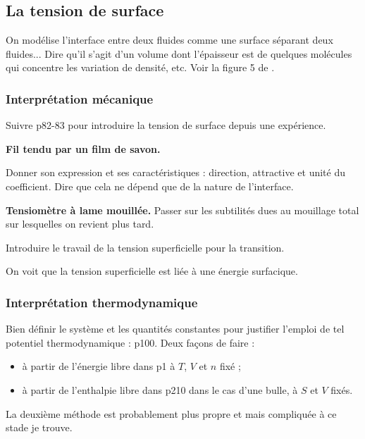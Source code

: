 \subsection{La tension de surface}

On modélise l'interface entre deux fluides comme une surface séparant deux fluides...
Dire qu'il s'agit d'un volume dont l'épaisseur est de quelques molécules qui concentre les variation de densité, etc.
Voir la figure 5 de \cite{Marchand2011}.

\subsubsection{Interprétation mécanique}

Suivre \cite{Diu2008} p82-83 pour introduire la tension de surface depuis une expérience.

\begin{experience}
\textbf{Fil tendu par un film de savon.}
\end{experience}

Donner son expression et ses caractéristiques : direction, attractive et unité du coefficient.
Dire que cela ne dépend que de la nature de l'interface.

\begin{experience}
\textbf{Tensiomètre à lame mouillée.}
Passer sur les subtilités dues au mouillage total sur lesquelles on revient plus tard.
\end{experience}

Introduire le travail de la tension superficielle pour la transition.

\begin{transition}
On voit que la tension superficielle est liée à une énergie surfacique.
\end{transition}

\subsubsection{Interprétation thermodynamique}

Bien définir le système et les quantités constantes pour justifier l'emploi de tel potentiel thermodynamique : \cite{Graner2011} p100.
Deux façons de faire :
\begin{itemize}
\item à partir de l'énergie libre dans \cite{Marchand2011} p1 à $T$, $V$ et $n$ fixé ;
\item à partir de l'enthalpie libre dans \cite{Diu2008} p210 dans le cas d'une bulle, à $S$ et $V$ fixés.
\end{itemize}
La deuxième méthode est probablement plus propre et mais compliquée à ce stade je trouve.

